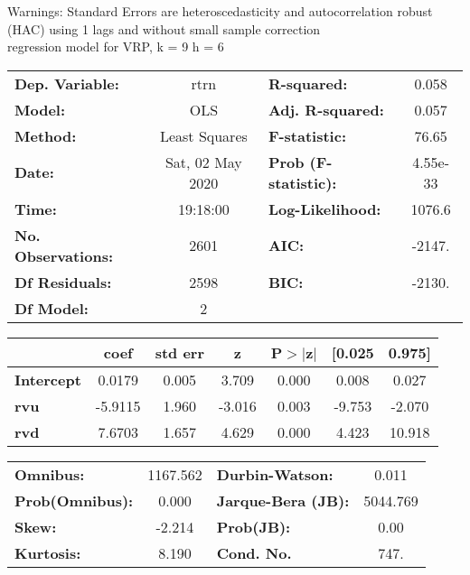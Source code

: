 Warnings: \newline
 [1] Standard Errors are heteroscedasticity and autocorrelation robust (HAC) using 1 lags and without small sample correction\\ 

regression model for VRP, k = 9 h = 6\begin{center}
\begin{tabular}{lclc}
\toprule
\textbf{Dep. Variable:}    &       rtrn       & \textbf{  R-squared:         } &     0.058   \\
\textbf{Model:}            &       OLS        & \textbf{  Adj. R-squared:    } &     0.057   \\
\textbf{Method:}           &  Least Squares   & \textbf{  F-statistic:       } &     76.65   \\
\textbf{Date:}             & Sat, 02 May 2020 & \textbf{  Prob (F-statistic):} &  4.55e-33   \\
\textbf{Time:}             &     19:18:00     & \textbf{  Log-Likelihood:    } &    1076.6   \\
\textbf{No. Observations:} &        2601      & \textbf{  AIC:               } &    -2147.   \\
\textbf{Df Residuals:}     &        2598      & \textbf{  BIC:               } &    -2130.   \\
\textbf{Df Model:}         &           2      & \textbf{                     } &             \\
\bottomrule
\end{tabular}
\begin{tabular}{lcccccc}
                   & \textbf{coef} & \textbf{std err} & \textbf{z} & \textbf{P$> |$z$|$} & \textbf{[0.025} & \textbf{0.975]}  \\
\midrule
\textbf{Intercept} &       0.0179  &        0.005     &     3.709  &         0.000        &        0.008    &        0.027     \\
\textbf{rvu}       &      -5.9115  &        1.960     &    -3.016  &         0.003        &       -9.753    &       -2.070     \\
\textbf{rvd}       &       7.6703  &        1.657     &     4.629  &         0.000        &        4.423    &       10.918     \\
\bottomrule
\end{tabular}
\begin{tabular}{lclc}
\textbf{Omnibus:}       & 1167.562 & \textbf{  Durbin-Watson:     } &    0.011  \\
\textbf{Prob(Omnibus):} &   0.000  & \textbf{  Jarque-Bera (JB):  } & 5044.769  \\
\textbf{Skew:}          &  -2.214  & \textbf{  Prob(JB):          } &     0.00  \\
\textbf{Kurtosis:}      &   8.190  & \textbf{  Cond. No.          } &     747.  \\
\bottomrule
\end{tabular}
\end{center}

